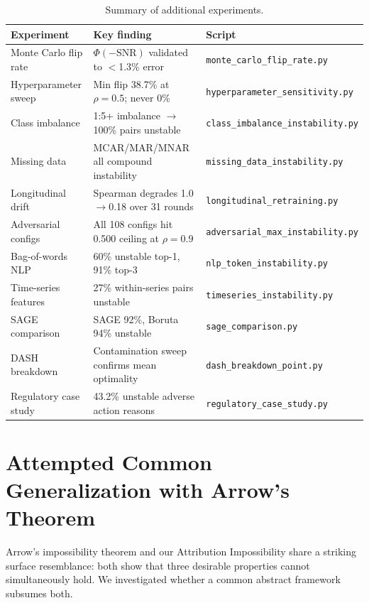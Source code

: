 \documentclass{article}
\begin{document}
\begin{table}[t]
\centering
\caption{Summary of additional experiments.}
\label{tab:experiment-summary-def}
\small
\begin{tabular}{@{}lll@{}}
\toprule
Experiment & Key finding & Script \\
\midrule
Monte Carlo flip rate & $\Phi(-\text{SNR})$ validated to $<$1.3\% error & \texttt{monte\_carlo\_flip\_rate.py} \\
Hyperparameter sweep & Min flip 38.7\% at $\rho{=}0.5$; never 0\% & \texttt{hyperparameter\_sensitivity.py} \\
Class imbalance & 1:5+ imbalance $\to$ 100\% pairs unstable & \texttt{class\_imbalance\_instability.py} \\
Missing data & MCAR/MAR/MNAR all compound instability & \texttt{missing\_data\_instability.py} \\
Longitudinal drift & Spearman degrades 1.0$\to$0.18 over 31 rounds & \texttt{longitudinal\_retraining.py} \\
Adversarial configs & All 108 configs hit 0.500 ceiling at $\rho{=}0.9$ & \texttt{adversarial\_max\_instability.py} \\
Bag-of-words NLP & 60\% unstable top-1, 91\% top-3 & \texttt{nlp\_token\_instability.py} \\
Time-series features & 27\% within-series pairs unstable & \texttt{timeseries\_instability.py} \\
SAGE comparison & SAGE 92\%, Boruta 94\% unstable & \texttt{sage\_comparison.py} \\
DASH breakdown & Contamination sweep confirms mean optimality & \texttt{dash\_breakdown\_point.py} \\
Regulatory case study & 43.2\% unstable adverse action reasons & \texttt{regulatory\_case\_study.py} \\
\bottomrule
\end{tabular}
\end{table}

\section{Attempted Common Generalization with Arrow's Theorem}
\label{sec:arrow-generalization}

Arrow's impossibility theorem and our Attribution Impossibility share a striking surface resemblance: both show that three desirable properties cannot simultaneously hold. We investigated whether a common abstract framework subsumes both.
\end{document}
